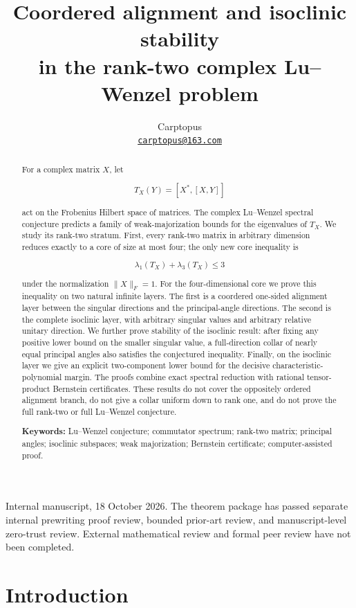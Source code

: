 \documentclass[11pt]{article}
\title{Coordered alignment and isoclinic stability\\
in the rank-two complex Lu--Wenzel problem}
\author{Carptopus\\\href{mailto:carptopus@163.com}{\texttt{carptopus@163.com}}}
\date{}
\begin{document}
\maketitle

Internal manuscript, 18 October 2026. The theorem package has passed separate internal prewriting proof review, bounded prior-art review, and manuscript-level zero-trust review. External mathematical review and formal peer review have not been completed.

\begin{abstract}
For a complex matrix $X$, let

\[
T_X(Y)=[X^*,[X,Y]]
\]

act on the Frobenius Hilbert space of matrices. The complex Lu--Wenzel spectral conjecture predicts a family of weak-majorization bounds for the eigenvalues of $T_X$. We study its rank-two stratum. First, every rank-two matrix in arbitrary dimension reduces exactly to a core of size at most four; the only new core inequality is

\[
\lambda_1(T_X)+\lambda_3(T_X)\le 3
\]

under the normalization $\|X\|_F=1$. For the four-dimensional core we prove this inequality on two natural infinite layers. The first is a coordered one-sided alignment layer between the singular directions and the principal-angle directions. The second is the complete isoclinic layer, with arbitrary singular values and arbitrary relative unitary direction. We further prove stability of the isoclinic result: after fixing any positive lower bound on the smaller singular value, a full-direction collar of nearly equal principal angles also satisfies the conjectured inequality. Finally, on the isoclinic layer we give an explicit two-component lower bound for the decisive characteristic-polynomial margin. The proofs combine exact spectral reduction with rational tensor-product Bernstein certificates. These results do not cover the oppositely ordered alignment branch, do not give a collar uniform down to rank one, and do not prove the full rank-two or full Lu--Wenzel conjecture.

\textbf{Keywords:} Lu--Wenzel conjecture; commutator spectrum; rank-two matrix; principal angles; isoclinic subspaces; weak majorization; Bernstein certificate; computer-assisted proof.

\end{abstract}

\section{Introduction}
\end{document}
